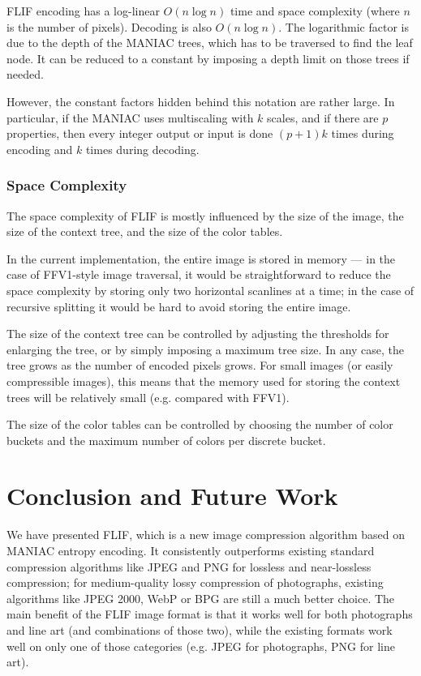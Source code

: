 \documentclass[a4paper,USenglish]{lipics}
\begin{document}
FLIF encoding has a log-linear $O(n \log n)$ time and space complexity (where $n$ is the number of pixels).
Decoding is also $O(n \log n)$. The logarithmic factor is due to the depth of the MANIAC trees, which has to be traversed to
find the leaf node. It can be reduced to a constant by imposing a depth limit on those trees if needed.

However, the constant factors hidden behind this notation are rather large.
In particular, if the MANIAC uses multiscaling with $k$ scales, and if there are $p$ properties, then every integer output or input
is done $(p+1)k$ times during encoding and $k$ times during decoding.





\subsubsection{Space Complexity}

The space complexity of FLIF is mostly influenced by the size of the image, the size of the context tree, and the size
of the color tables.

In the current implementation, the entire image is stored in memory --- in the case of FFV1-style image traversal,
it would be straightforward to reduce the space complexity by storing only two horizontal scanlines at a time;
in the case of recursive splitting it would be hard to avoid storing the entire image.

The size of the context tree can be controlled by adjusting the thresholds for enlarging the tree, or by simply
imposing a maximum tree size. In any case, the tree grows as the number of encoded pixels grows. For small images
(or easily compressible images), this means that the memory used for storing the context trees will be relatively small
(e.g. compared with FFV1).

The size of the color tables can be controlled by choosing the number of color buckets and the maximum
number of colors per discrete bucket.






\section{Conclusion and Future Work}
\label{sec:conclusion}

We have presented FLIF, which is a new image compression algorithm based on MANIAC entropy encoding.
It consistently outperforms existing standard compression algorithms like JPEG and PNG for lossless and near-lossless
compression; for medium-quality lossy compression of photographs, existing algorithms like JPEG 2000, WebP or BPG are still
a much better choice.
The main benefit of the FLIF image format is that it works well for both photographs and line art
(and combinations of those two), while the existing formats work well on only one of those categories (e.g. JPEG for photographs,
PNG for line art).
\end{document}
